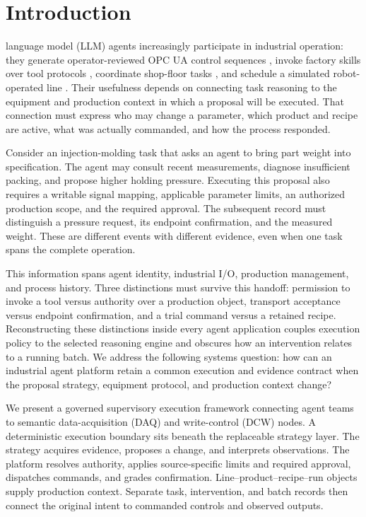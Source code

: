 \section{Introduction}
 language model (LLM) agents increasingly participate in
industrial operation: they generate operator-reviewed OPC UA control sequences
\cite{huang2026made}, invoke factory skills over tool protocols
\cite{koehle2026llmdriven}, coordinate shop-floor tasks
\cite{lim2025llmenabled,zhao2026shopfloor}, and schedule a simulated
robot-operated line \cite{waseem2026pretrained}. Their usefulness depends on
connecting task reasoning to the equipment and production context in which
a proposal will be executed. That connection must express who may change a
parameter, which product and recipe are active, what was actually commanded,
and how the process responded.

Consider an injection-molding task that asks an agent to bring part weight
into specification. The agent may consult recent measurements, diagnose
insufficient packing, and propose higher holding pressure. Executing this
proposal also requires a writable signal mapping, applicable parameter
limits, an authorized production scope, and the required approval. The
subsequent record must distinguish a pressure request, its endpoint
confirmation, and the measured weight. These are different events with
different evidence, even when one task spans the complete operation.

This information spans agent identity, industrial I/O, production
management, and process history. Three distinctions must survive this
handoff: permission to invoke a tool versus authority over a production
object, transport acceptance versus endpoint confirmation, and a trial
command versus a retained recipe. Reconstructing these distinctions inside
every agent application couples execution policy to the selected reasoning
engine and obscures how an intervention relates to a running batch. We
address the following systems question: how can an industrial
agent platform retain a common execution and evidence contract when the
proposal strategy, equipment protocol, and production context change?

We present a governed supervisory execution framework connecting agent
teams to semantic data-acquisition (DAQ) and write-control (DCW) nodes.
A deterministic execution boundary sits beneath the replaceable strategy
layer. The strategy acquires evidence, proposes a change, and interprets
observations. The platform resolves authority, applies source-specific
limits and required approval, dispatches commands, and grades confirmation.
Line--product--recipe--run objects supply production context.
Separate task, intervention, and batch records then connect the original
intent to commanded controls and observed outputs.

